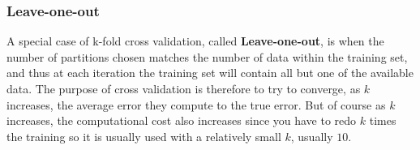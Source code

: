 \subsubsection{Leave-one-out}
A special case of k-fold cross validation, called \textbf{Leave-one-out}, is when the number of partitions chosen matches the number of data within the training set, and thus at each iteration the training set will contain all but one of the available data.
The purpose of cross validation is therefore to try to converge, as $k$ increases, the average error they compute to the true error. But of course as $k$ increases, the computational cost also increases since you have to redo $k$ times the training so it is usually used with a relatively small $k$, usually $10$.



\newpage